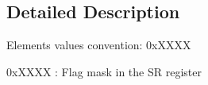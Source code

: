 \subsection{Detailed Description}
Elements values convention\+: 0x\+X\+X\+XX
\begin{DoxyItemize}
\item 0x\+X\+X\+XX \+: Flag mask in the SR register 
\end{DoxyItemize}